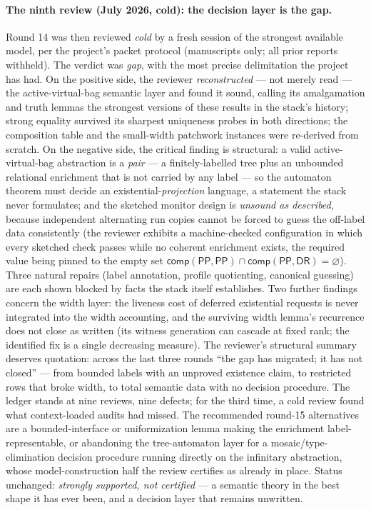 \documentclass[
]{ceurart}
\theoremstyle{definition}
\newcommand{\DR}{\ensuremath{\mathsf{DR}}}
\newcommand{\PP}{\ensuremath{\mathsf{PP}}}
\newcommand{\comp}{\ensuremath{\mathsf{comp}}}
\begin{document}
\paragraph{The ninth review (July 2026, cold): the decision layer is the gap.}
Round 14 was then reviewed \emph{cold} by a fresh session of the strongest
available model, per the project's packet protocol (manuscripts only; all
prior reports withheld).  The verdict was \emph{gap}, with the most precise
delimitation the project has had.  On the positive side, the reviewer
\emph{reconstructed} --- not merely read --- the active-virtual-bag semantic
layer and found it sound, calling its amalgamation and truth lemmas the
strongest versions of these results in the stack's history; strong equality
survived its sharpest uniqueness probes in both directions; the composition
table and the small-width patchwork instances were re-derived from scratch.
On the negative side, the critical finding is structural: a valid
active-virtual-bag abstraction is a \emph{pair} --- a finitely-labelled tree
plus an unbounded relational enrichment that is not carried by any label ---
so the automaton theorem must decide an existential-\emph{projection}
language, a statement the stack never formulates; and the sketched monitor
design is \emph{unsound as described}, because independent alternating run
copies cannot be forced to guess the off-label data consistently (the
reviewer exhibits a machine-checked configuration in which every sketched
check passes while no coherent enrichment exists, the required value being
pinned to the empty set $\comp(\PP,\PP)\cap\comp(\PP,\DR)=\varnothing$).
Three natural repairs (label annotation, profile quotienting, canonical
guessing) are each shown blocked by facts the stack itself establishes.
Two further findings concern the width layer: the liveness cost of deferred
existential requests is never integrated into the width accounting, and the
surviving width lemma's recurrence does not close as written (its witness
generation can cascade at fixed rank; the identified fix is a single
decreasing measure).  The reviewer's structural summary deserves quotation:
across the last three rounds ``the gap has migrated; it has not closed'' ---
from bounded labels with an unproved existence claim, to restricted rows
that broke width, to total semantic data with no decision procedure.  The
ledger stands at nine reviews, nine defects; for the third time, a cold
review found what context-loaded audits had missed.  The recommended
round-15 alternatives are a bounded-interface or uniformization lemma making
the enrichment label-representable, or abandoning the tree-automaton layer
for a mosaic/type-elimination decision procedure running directly on the
infinitary abstraction, whose model-construction half the review certifies
as already in place.  Status unchanged: \emph{strongly supported, not
certified} --- a semantic theory in the best shape it has ever been, and a
decision layer that remains unwritten.
\end{document}
